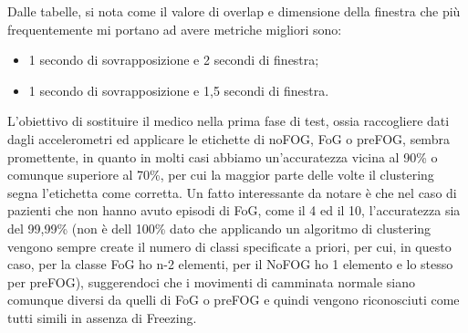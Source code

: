 Dalle tabelle, si nota come il valore di overlap e dimensione della finestra che più frequentemente mi portano ad avere metriche migliori sono:
\begin{itemize}
	\item 1 secondo di sovrapposizione e 2 secondi di finestra;
	\item 1 secondo di sovrapposizione e 1,5 secondi di finestra.
\end{itemize}
L'obiettivo di sostituire il medico nella prima fase di test, ossia raccogliere dati dagli accelerometri ed applicare le etichette di noFOG, FoG o preFOG, sembra promettente, in quanto in molti casi abbiamo un'accuratezza vicina al 90\% o comunque superiore al 70\%, per cui la maggior parte delle volte il clustering segna l'etichetta come corretta. Un fatto interessante da notare è che nel caso di pazienti che non hanno avuto episodi di FoG, come il 4 ed il 10, l'accuratezza sia del 99,99\% (non è dell 100\% dato che applicando un algoritmo di clustering vengono sempre create il numero di classi specificate a priori, per cui, in questo caso, per la classe FoG ho n-2 elementi, per il NoFOG ho 1 elemento e lo stesso per preFOG), suggerendoci che i movimenti di camminata normale siano comunque diversi da quelli di FoG o preFOG e quindi vengono riconosciuti come tutti simili in assenza di Freezing.\\
